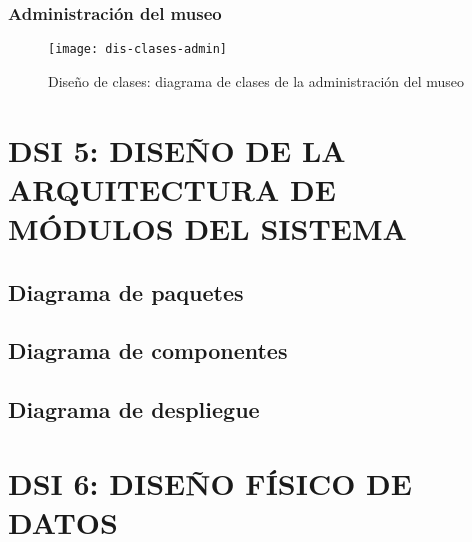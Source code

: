 \subsubsection{Administración del museo}
\begin{figure}[H]
\centering
\centerline{\texttt{[image: dis-clases-admin]}}
\caption{Diseño de clases: diagrama de clases de la administración del museo}
\end{figure}

\newpage
\section{DSI 5: DISEÑO DE LA ARQUITECTURA DE MÓDULOS DEL SISTEMA}

\subsection{Diagrama de paquetes}

\subsection{Diagrama de componentes}

\subsection{Diagrama de despliegue}



\newpage
\section{DSI 6: DISEÑO FÍSICO DE DATOS}

